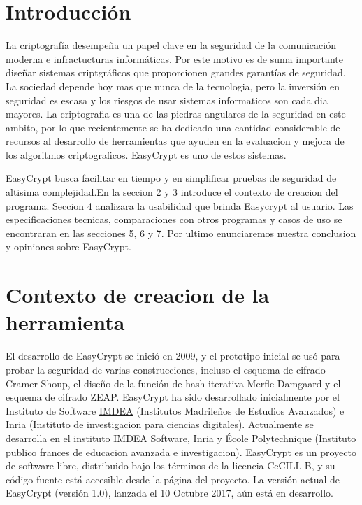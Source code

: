 \documentclass[runningheads,a4paper]{llncs}
\begin{document}
\section{Introducción}
La criptografía desempeña un papel clave en la seguridad de la comunicación moderna e infractucturas informáticas.  Por este motivo es de suma importante diseñar sistemas criptgráficos que proporcionen grandes garantías de seguridad.
La sociedad depende hoy mas que nunca de la tecnologia, pero la inversión en seguridad es escasa y los riesgos de usar sistemas informaticos son cada dia mayores. La criptografia es una de las piedras angulares de la seguridad en este  ambito, por lo que recientemente se ha dedicado una cantidad considerable de recursos al desarrollo de herramientas que ayuden en la evaluacion y mejora de los algoritmos criptograficos. EasyCrypt es uno de estos sistemas.

EasyCrypt busca facilitar en tiempo y en simplificar pruebas de seguridad de altisima complejidad.En la seccion 2 y 3 introduce el contexto de creacion del programa. Seccion 4 analizara la usabilidad que brinda Easycrypt al usuario. Las especificaciones tecnicas, comparaciones con otros programas y casos de uso se encontraran en las secciones 5, 6 y 7. Por ultimo enunciaremos nuestra conclusion y opiniones sobre EasyCrypt.
    
\section{Contexto de creacion de la herramienta}
El desarrollo de EasyCrypt se inició en 2009, y el prototipo inicial se usó para probar la seguridad de varias construcciones, incluso el esquema de cifrado Cramer-Shoup, el diseño de la función de hash iterativa Merfle-Damgaard y el esquema de cifrado ZEAP. EasyCrypt ha sido desarrollado inicialmente por el Instituto de Software \href{http://www.imdea.org/es}{IMDEA} (Institutos Madrileños de Estudios Avanzados) e \href{https://www.inria.fr/en/}{Inria} (Instituto de investigacion para ciencias digitales). Actualmente se desarrolla en el instituto IMDEA Software, Inria y \href{https://www.polytechnique.edu/}{École Polytechnique} (Instituto publico frances de educacion avanzada e investigacion). EasyCrypt es un proyecto de software libre, distribuido bajo los términos de la licencia CeCILL-B, y su código fuente está accesible desde la página del proyecto. 
La versión actual de EasyCrypt (versión 1.0), lanzada el 10 Octubre 2017, aún está en desarrollo. 
\cite{article2}
\end{document}
